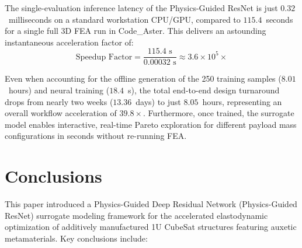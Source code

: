 \documentclass[preprint,12pt,3p]{elsarticle}
\begin{document}
The single-evaluation inference latency of the Physics-Guided ResNet is just $0.32$~milliseconds on a standard workstation CPU/GPU, compared to $115.4$~seconds for a single full 3D FEA run in Code\_Aster. This delivers an astounding instantaneous acceleration factor of:
\begin{equation}
  \text{Speedup Factor} = \frac{115.4\text{ s}}{0.00032\text{ s}} \approx 3.6 \times 10^5\times
\end{equation}

Even when accounting for the offline generation of the 250 training samples ($8.01$~hours) and neural training ($18.4$~s), the total end-to-end design turnaround drops from nearly two weeks ($13.36$~days) to just $8.05$~hours, representing an overall workflow acceleration of $39.8\times$. Furthermore, once trained, the surrogate model enables interactive, real-time Pareto exploration for different payload mass configurations in seconds without re-running FEA.

\section{Conclusions}
\label{sec:conclusions}

This paper introduced a Physics-Guided Deep Residual Network (Physics-Guided ResNet) surrogate modeling framework for the accelerated elastodynamic optimization of additively manufactured 1U CubeSat structures featuring auxetic metamaterials. Key conclusions include:
\end{document}
